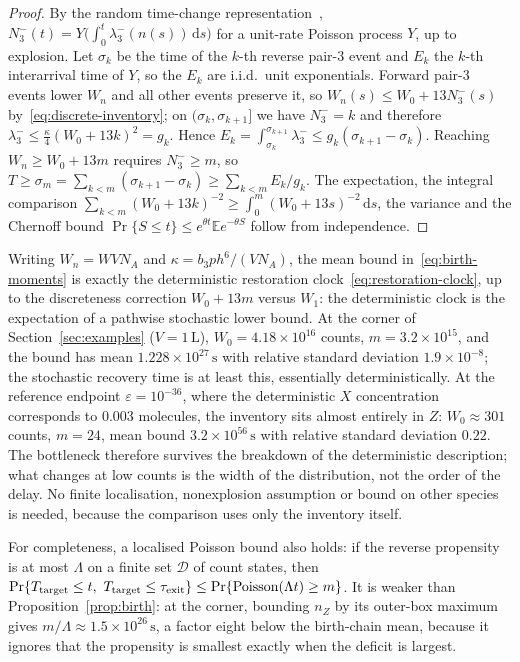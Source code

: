 \documentclass[11pt,a4paper]{article}
\theoremstyle{plain}
\theoremstyle{definition}
\theoremstyle{remark}
\newcommand{\eps}{\varepsilon}
\newcommand{\calD}{\mathcal D}
\newcommand{\dd}{\,\mathrm d}
\begin{document}
\begin{proof}
By the random time-change representation~\cite{Kurtz1972,AndersonKurtz2015}, $N_3^-(t)=Y\big(\int_0^t\lambda_3^-(n(s))\dd s\big)$ for a unit-rate Poisson process $Y$, up to explosion. Let $\sigma_k$ be the time of the $k$-th reverse pair-$3$ event and $E_k$ the $k$-th interarrival time of $Y$, so the $E_k$ are i.i.d.\ unit exponentials. Forward pair-$3$ events lower $W_n$ and all other events preserve it, so $W_n(s)\le W_0+13N_3^-(s)$ by~\eqref{eq:discrete-inventory}; on $(\sigma_k,\sigma_{k+1}]$ we have $N_3^-=k$ and therefore $\lambda_3^-\le\tfrac\kappa4(W_0+13k)^2=g_k$. Hence $E_k=\int_{\sigma_k}^{\sigma_{k+1}}\lambda_3^-\le g_k(\sigma_{k+1}-\sigma_k)$. Reaching $W_n\ge W_0+13m$ requires $N_3^-\ge m$, so $T\ge\sigma_m=\sum_{k<m}(\sigma_{k+1}-\sigma_k)\ge\sum_{k<m}E_k/g_k$. The expectation, the integral comparison $\sum_{k<m}(W_0+13k)^{-2}\ge\int_0^m(W_0+13s)^{-2}\dd s$, the variance and the Chernoff bound $\Pr\{S\le t\}\le e^{\theta t}\mathbb E e^{-\theta S}$ follow from independence.
\end{proof}

Writing $W_n=WVN_{\!A}$ and $\kappa=b_3ph^6/(VN_{\!A})$, the mean bound in~\eqref{eq:birth-moments} is exactly the deterministic restoration clock~\eqref{eq:restoration-clock}, up to the discreteness correction $W_0+13m$ versus $W_1$: the deterministic clock is the expectation of a pathwise stochastic lower bound. At the corner of Section~\ref{sec:examples} ($V=1\,\mathrm L$), $W_0=4.18\times10^{16}$ counts, $m=3.2\times10^{15}$, and the bound has mean $1.228\times10^{27}\,\mathrm s$ with relative standard deviation $1.9\times10^{-8}$; the stochastic recovery time is at least this, essentially deterministically. At the reference endpoint $\eps=10^{-36}$, where the deterministic $X$ concentration corresponds to $0.003$ molecules, the inventory sits almost entirely in $Z$: $W_0\approx301$ counts, $m=24$, mean bound $3.2\times10^{56}\,\mathrm s$ with relative standard deviation $0.22$. The bottleneck therefore survives the breakdown of the deterministic description; what changes at low counts is the width of the distribution, not the order of the delay. No finite localisation, nonexplosion assumption or bound on other species is needed, because the comparison uses only the inventory itself.

For completeness, a localised Poisson bound also holds: if the reverse propensity is at most $\Lambda$ on a finite set $\calD$ of count states, then $\Pr\{T_{\rm target}\le t,\ T_{\rm target}\le\tau_{\rm exit}\}\le\Pr\{\mathrm{Poisson}(\Lambda t)\ge m\}$. It is weaker than Proposition~\ref{prop:birth}: at the corner, bounding $n_Z$ by its outer-box maximum gives $m/\Lambda\approx1.5\times10^{26}\,\mathrm s$, a factor eight below the birth-chain mean, because it ignores that the propensity is smallest exactly when the deficit is largest.
\end{document}
